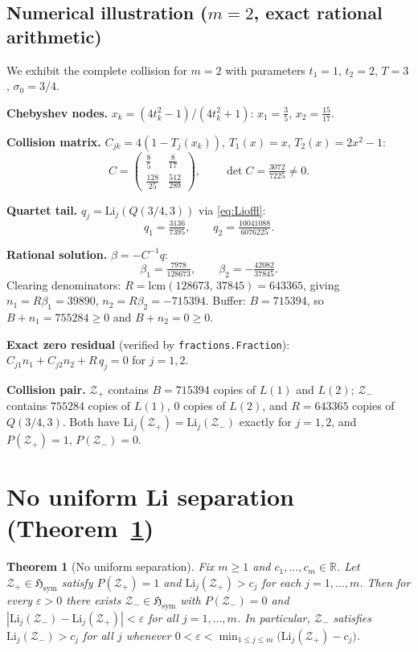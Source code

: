 \documentclass[12pt]{amsart}
\theoremstyle{definition}
\theoremstyle{remark}
\theoremstyle{plain}
\newtheorem{mainthm}{Theorem}
\newcommand{\Hsym}{\mathfrak{H}_{\mathrm{sym}}}
\newcommand{\Li}{\mathrm{Li}}
\newcommand{\RR}{\mathbb{R}}
\begin{document}
\subsection{Numerical illustration (\texorpdfstring{$m=2$}{m=2}, exact rational arithmetic)}

We exhibit the complete collision for $m=2$ with parameters
$t_1=1$, $t_2=2$, $T=3$, $\sigma_0=3/4$.

\textbf{Chebyshev nodes.}
$x_k = (4t_k^2-1)/(4t_k^2+1)$:
$x_1 = \tfrac{3}{5}$, $x_2 = \tfrac{15}{17}$.

\textbf{Collision matrix.}  $C_{jk} = 4(1-T_j(x_k))$, $T_1(x)=x$, $T_2(x)=2x^2-1$:
\[
  C = \begin{pmatrix} \tfrac{8}{5} & \tfrac{8}{17} \\[4pt]
                      \tfrac{128}{25} & \tfrac{512}{289} \end{pmatrix},
  \qquad \det C = \tfrac{3072}{7225} \neq 0.
\]

\textbf{Quartet tail.}  $q_j = \Li_j(Q(3/4, 3))$ via \eqref{eq:Lioffl}:
\[
  q_1 = \tfrac{3136}{7395}, \qquad q_2 = \tfrac{10041088}{6076225}.
\]

\textbf{Rational solution.}  $\beta = -C^{-1}q$:
\[
  \beta_1 = \tfrac{7978}{128673}, \qquad
  \beta_2 = -\tfrac{42082}{37845}.
\]
Clearing denominators: $R = \mathrm{lcm}(128673,\, 37845) = 643365$, giving
$n_1 = R\beta_1 = 39890$, $n_2 = R\beta_2 = -715394$.
Buffer: $B = 715394$, so $B+n_1 = 755284 \geq 0$ and $B+n_2 = 0 \geq 0$.

\textbf{Exact zero residual} (verified by \texttt{fractions.Fraction}):
$C_{j1}n_1 + C_{j2}n_2 + R\,q_j = 0$ for $j=1,2$.

\textbf{Collision pair.}  $\mathcal{Z}_+$ contains $B = 715394$ copies of
$L(1)$ and $L(2)$; $\mathcal{Z}_-$ contains $755284$ copies of $L(1)$,
$0$ copies of $L(2)$, and $R = 643365$ copies of $Q(3/4, 3)$.
Both have $\Li_j(\mathcal{Z}_+) = \Li_j(\mathcal{Z}_-)$ exactly for $j=1,2$,
and $P(\mathcal{Z}_+) = 1$, $P(\mathcal{Z}_-) = 0$.

\section{No uniform Li separation (Theorem~\ref{thm:B})}
\label{sec:B1}

\begin{mainthm}[No uniform separation]
\label{thm:B}
Fix $m \geq 1$ and $c_1,\ldots,c_m \in \RR$.  Let $\mathcal{Z}_+ \in \Hsym$
satisfy $P(\mathcal{Z}_+)=1$ and $\Li_j(\mathcal{Z}_+) > c_j$ for each
$j=1,\ldots,m$.  Then for every $\varepsilon > 0$ there exists
$\mathcal{Z}_- \in \Hsym$ with $P(\mathcal{Z}_-) = 0$ and
$|\Li_j(\mathcal{Z}_-) - \Li_j(\mathcal{Z}_+)| < \varepsilon$
for all $j = 1, \ldots, m$.
In particular, $\mathcal{Z}_-$ satisfies $\Li_j(\mathcal{Z}_-) > c_j$ for all $j$
whenever
$0 < \varepsilon < \min_{1 \leq j \leq m}\bigl(\Li_j(\mathcal{Z}_+) - c_j\bigr)$.
\end{mainthm}
\end{document}
